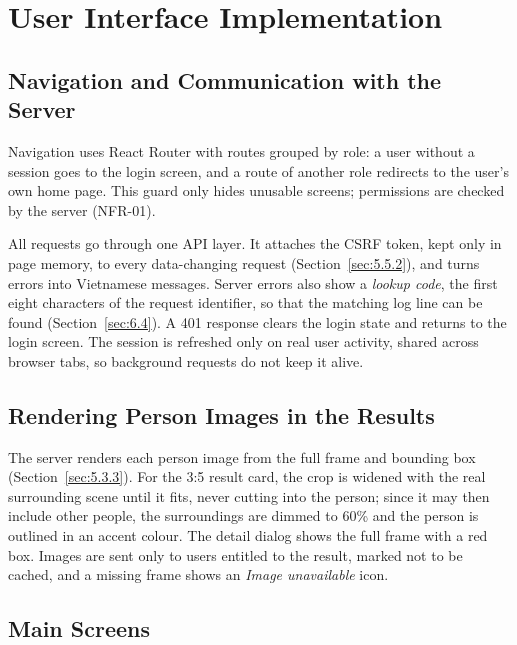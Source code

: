 \section{User Interface Implementation}
\label{sec:6.3}

\subsection{Navigation and Communication with the Server}
\label{sec:6.3.1}
\label{sec:6.3.2}

Navigation uses React Router with routes grouped by role: a user without a session goes to the login screen, and a route of another role redirects to the user's own home page. This guard only hides unusable screens; permissions are checked by the server (NFR-01).

All requests go through one API layer. It attaches the CSRF token, kept only in page memory, to every data-changing request (Section~\ref{sec:5.5.2}), and turns errors into Vietnamese messages. Server errors also show a \emph{lookup code}, the first eight characters of the request identifier, so that the matching log line can be found (Section~\ref{sec:6.4}). A 401 response clears the login state and returns to the login screen. The session is refreshed only on real user activity, shared across browser tabs, so background requests do not keep it alive.

\subsection{Rendering Person Images in the Results}
\label{sec:6.3.3}

The server renders each person image from the full frame and bounding box (Section~\ref{sec:5.3.3}). For the 3:5 result card, the crop is widened with the real surrounding scene until it fits, never cutting into the person; since it may then include other people, the surroundings are dimmed to 60\% and the person is outlined in an accent colour. The detail dialog shows the full frame with a red box. Images are sent only to users entitled to the result, marked not to be cached, and a missing frame shows an \emph{Image unavailable} icon.

\subsection{Main Screens}
\label{sec:6.3.4}


